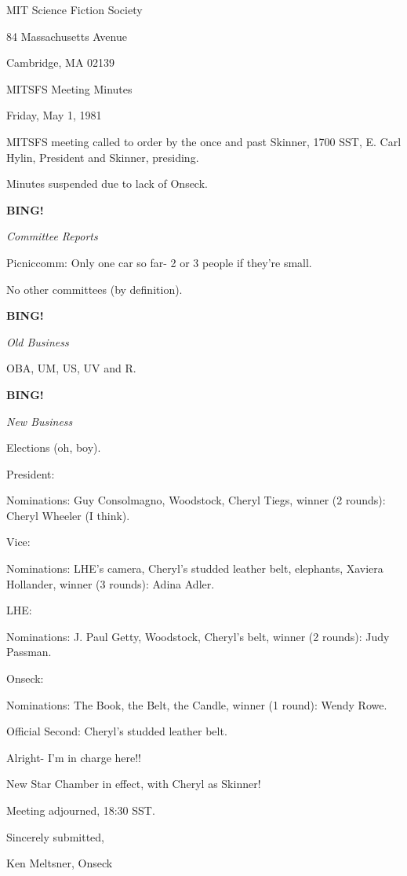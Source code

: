 \documentclass[12pt]{article}
\newcommand{\bing}{{\bf BING!} }
\newcommand{\goto}[1]{\bing \vskip 12pt \centerline{{\em{#1}}}}
\begin{document}
\begin{center}

MIT Science Fiction Society 

84 Massachusetts Avenue

Cambridge, MA 02139

\vspace{12pt}

MITSFS Meeting Minutes 

Friday, May 1, 1981

\end{center}
 
\vspace{18pt}

\setlength{\parskip}{6pt}

\noindent
MITSFS meeting called to order by the once and past Skinner, 1700 SST,
E. Carl Hylin, President and Skinner, presiding.

Minutes suspended due to lack of Onseck.

\goto{Committee Reports}

Picniccomm: Only one car so far- 2 or 3 people if they're small.

No other committees (by definition).

\goto{Old Business}

OBA, UM, US, UV and R.

\goto{New Business}

Elections (oh, boy).

President:

Nominations: Guy Consolmagno, Woodstock, Cheryl Tiegs, winner (2 rounds): Cheryl Wheeler (I think).

Vice:

Nominations: LHE's camera, Cheryl's studded leather belt, elephants, Xaviera Hollander, winner (3 rounds): Adina Adler.

LHE:

Nominations: J. Paul Getty, Woodstock, Cheryl's belt, winner (2 rounds): Judy Passman.

Onseck:

Nominations: The Book, the Belt, the Candle, winner (1 round): Wendy Rowe.

Official Second: Cheryl's studded leather belt.

Alright- I'm in charge here!!

New Star Chamber in effect, with Cheryl as Skinner!

\vspace{12pt}

\noindent
Meeting adjourned, 18:30 SST.

\vspace{18pt}

\centerline{Sincerely submitted,}
\centerline{Ken Meltsner, Onseck}
\end{document}
